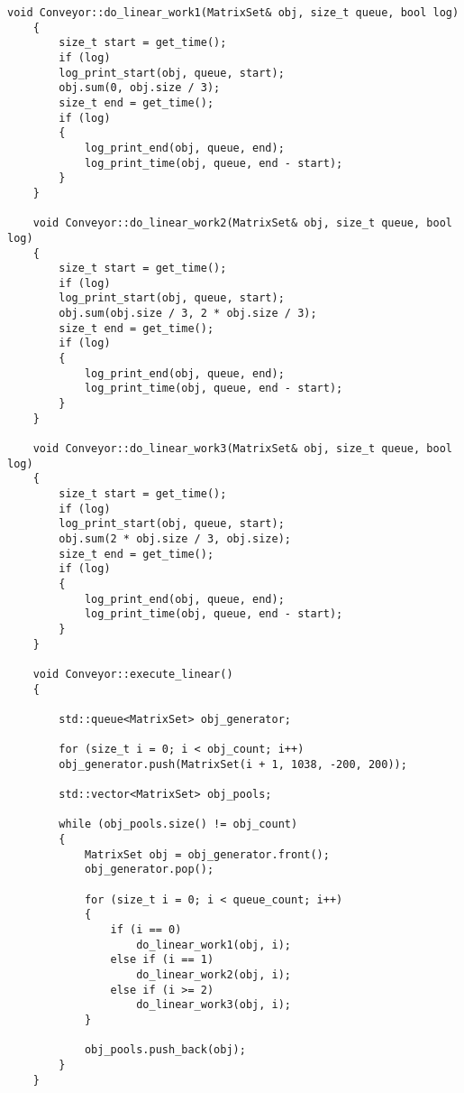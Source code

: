 \documentclass[12pt, a4paper]{report}
\begin{document}
	\begin{lstlisting}[label=code:lin,caption=Реализация линейной обработки матрицы]
	void Conveyor::do_linear_work1(MatrixSet& obj, size_t queue, bool log)
	{
		size_t start = get_time();
		if (log)
		log_print_start(obj, queue, start);
		obj.sum(0, obj.size / 3);
		size_t end = get_time();
		if (log)
		{
			log_print_end(obj, queue, end);
			log_print_time(obj, queue, end - start);
		}
	}
	
	void Conveyor::do_linear_work2(MatrixSet& obj, size_t queue, bool log)
	{
		size_t start = get_time();
		if (log)
		log_print_start(obj, queue, start);
		obj.sum(obj.size / 3, 2 * obj.size / 3);
		size_t end = get_time();
		if (log)
		{
			log_print_end(obj, queue, end);
			log_print_time(obj, queue, end - start);
		}
	}
	
	void Conveyor::do_linear_work3(MatrixSet& obj, size_t queue, bool log)
	{
		size_t start = get_time();
		if (log)
		log_print_start(obj, queue, start);
		obj.sum(2 * obj.size / 3, obj.size);
		size_t end = get_time();
		if (log)
		{
			log_print_end(obj, queue, end);
			log_print_time(obj, queue, end - start);
		}
	}
	
	void Conveyor::execute_linear()
	{
		
		std::queue<MatrixSet> obj_generator;
		
		for (size_t i = 0; i < obj_count; i++)
		obj_generator.push(MatrixSet(i + 1, 1038, -200, 200));
		
		std::vector<MatrixSet> obj_pools;
		
		while (obj_pools.size() != obj_count)
		{
			MatrixSet obj = obj_generator.front();
			obj_generator.pop();
			
			for (size_t i = 0; i < queue_count; i++)
			{
				if (i == 0)
					do_linear_work1(obj, i);
				else if (i == 1)
					do_linear_work2(obj, i);
				else if (i >= 2)
					do_linear_work3(obj, i);
			}
		
			obj_pools.push_back(obj);
		}
	}
	\end{lstlisting}
	
\end{document}

